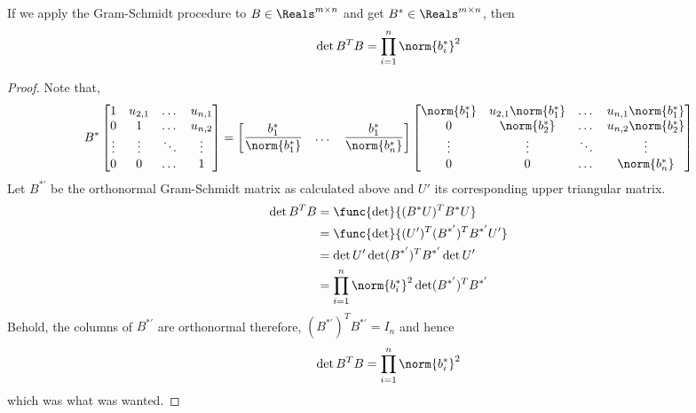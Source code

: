 \begin{lemma}
    If we apply the Gram-Schmidt procedure to \(B \in \Reals^{m \times n}\) and get \(B^{\ast} \in \Reals^{m \times n}\), then 
    \begin{equation*}
        \det B^T B = \prod_{i = 1}^n \norm{b_i^{\ast}}^2
    \end{equation*}
\end{lemma}
\begin{proof}
    Note that,
    \begin{equation*}
        B^{\ast} \begin{bmatrix}
            1 & u_{2,1} & \dots & u_{n,1}\\
            0 & 1 & \dots & u_{n,2}\\
            \vdots& \vdots& \ddots& \vdots \\
            0 & 0 & \dots & 1 
        \end{bmatrix} = \begin{bmatrix}
            \dfrac{b_1^{\ast}}{\norm{b_1^{\ast}}} & \dots & \dfrac{{b_1^{\ast}}}{\norm{b_n^{\ast}}}
        \end{bmatrix}
            \begin{bmatrix}
            \norm{b_1^{\ast}} & u_{2,1}\norm{b_1^{\ast}} & \dots & u_{n,1}\norm{b_1^{\ast}}\\
            0 & \norm{b_2^{\ast}} & \dots & u_{n,2}\norm{b_2^{\ast}}\\
            \vdots& \vdots& \ddots& \vdots \\
            0 & 0 & \dots & \norm{b_n^{\ast}}
        \end{bmatrix}
    \end{equation*}
    Let \(B^{\ast'}\) be the orthonormal Gram-Schmidt matrix as calculated above and \(U'\) its corresponding upper triangular matrix.
    \begin{align*}
        \det B^T B &= \func{\det}{ (B^{\ast}U)^T B^{\ast} U}\\
        &= \func{\det}{(U')^T (B^{\ast'})^T B^{\ast'} U'}\\
        &= \det U' \det (B^{\ast'})^T B^{\ast'} \det U'\\
        &= \prod_{i = 1}^n \norm{b_i^{\ast}}^2 \det (B^{\ast'})^T B^{\ast'}
    \end{align*}
    Behold, the columns of \(B^{\ast'}\) are orthonormal therefore, \((B^{\ast'})^T B^{\ast'} = I_n\) and hence 
    \begin{equation*}
        \det B^T B = \prod_{i = 1}^n \norm{b_i^{\ast}}^2
    \end{equation*}
    which was what was wanted. 
\end{proof}

